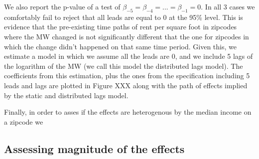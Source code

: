 
We also report the p-value of a test of $\beta_{-5} = \beta_{-4} = ... = \beta_{-1} = 0$. In all 3 cases we comfortably fail to reject that all leads are equal to 0 at the 95\% level. This is evidence that the pre-existing time paths of rent per square foot in zipcodes where the MW changed is not significantly different that the one for zipcodes in which the change didn't happened on that same time period. Given this, we estimate a model in which we assume all the leads are 0, and we include 5 lags of the logarithm of the MW (we call this model the distributed lags model). The coefficients from this estimation, plus the ones from the specification including 5 leads and lags are plotted in Figure XXX along with the path of effects implied by the static and distributed lags model. 


Finally, in order to asses if the effects are heterogenous by the median income on a zipcode we 

\subsection{Assessing magnitude of the effects}\label{subsec:results/magnitude}


